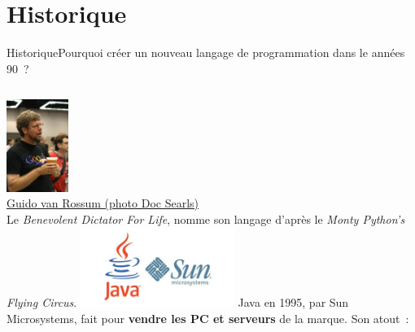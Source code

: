 \documentclass{beamer}
\begin{document}
    \section{Historique}\label{sec:history}
    \begin{frame}{Historique}{Pourquoi créer un nouveau langage de programmation dans le années 90~?}
        \begin{footnotesize}
            \begin{columns}
                \centering
                \includegraphics[width=2cm]{image/guido-van-rossum} \\ \href{https://www.flickr.com/photos/docsearls/}{Guido van Rossum (photo Doc Searls)} \\
                Le \textit{Benevolent Dictator For Life}, nomme son langage d'après le \textit{Monty Python’s Flying Circus}.
                \bigbreak
                \centering
                \includegraphics[width=5cm]{image/sun-java-logo}
                \flushleft
                Java en 1995, par Sun Microsystems, fait pour \textbf{vendre les PC et serveurs} de la marque.
                \bigbreak
                Son atout~: \footnotemark
            \end{columns}
        \end{footnotesize}
    \end{frame}
\end{document}
